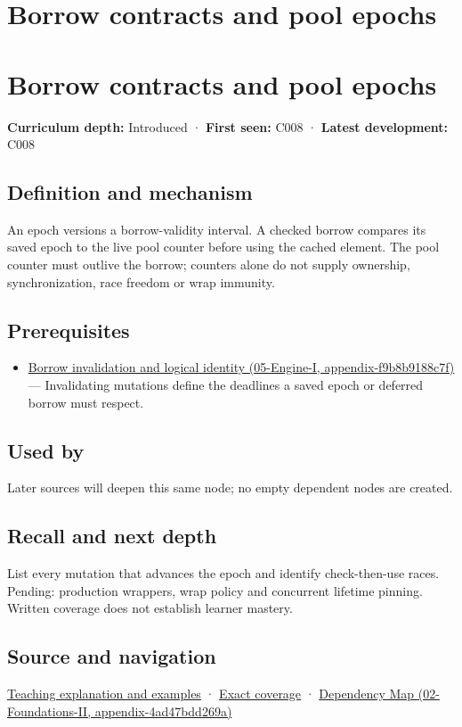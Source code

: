\hypertarget{appendix-aa405b7c3903}{}
\section*{Borrow contracts and pool epochs}
\section{Borrow contracts and pool epochs}\label{borrow-contracts-and-pool-epochs}

\textbf{Curriculum depth:} Introduced · \textbf{First seen:} C008 · \textbf{Latest development:} C008

\subsection{Definition and mechanism}\label{definition-and-mechanism}

An epoch versions a borrow-validity interval. A checked borrow compares its saved epoch to the live pool counter before using the cached element. The pool counter must outlive the borrow; counters alone do not supply ownership, synchronization, race freedom or wrap immunity.

\subsection{Prerequisites}\label{prerequisites}

\begin{itemize}
\tightlist
\item
  \href{}{Borrow invalidation and logical identity (05-Engine-I, appendix-f9b8b9188c7f)} --- Invalidating mutations define the deadlines a saved epoch or deferred borrow must respect.
\end{itemize}

\subsection{Used by}\label{used-by}

Later sources will deepen this same node; no empty dependent nodes are created.

\subsection{Recall and next depth}\label{recall-and-next-depth}

List every mutation that advances the epoch and identify check-then-use races. Pending: production wrappers, wrap policy and concurrent lifetime pinning. Written coverage does not establish learner mastery.

\subsection{Source and navigation}\label{source-and-navigation}

\href{Continuous\%20Notes/Computing\%20Foundations\%20-\%20From\%20Bits\%20to\%20C++\%20and\%20Systems\%20APIs\#When\%20a\%20valid\%20borrow\%20stops\%20naming\%20the\%20intended\%20thing}{Teaching explanation and examples} · \hyperref[appendix-fd090d982a15]{Exact coverage} · \href{}{Dependency Map (02-Foundations-II, appendix-4ad47bdd269a)}
